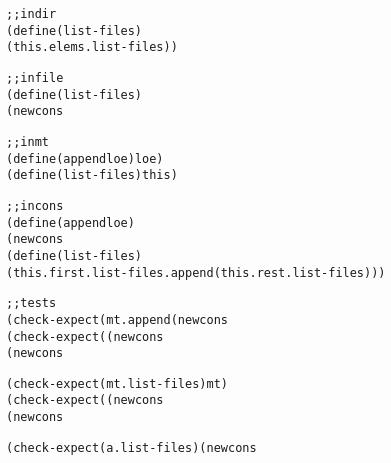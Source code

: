 \documentclass[12pt]{article}                   %
\newenvironment{solution}{\color{red}}{}
\begin{document}
\begin{problem}
\begin{solution}
\begin{alltt}
;; in dir%
(define (list-files)
  (this . elems . list-files))

;; in file%
(define (list-files)
  (new cons% this (new mt%)))

;; in mt%
(define (append loe) loe)
(define (list-files) this)

;; in cons%
(define (append loe)
  (new cons% (this . first) (this . rest . append loe)))
(define (list-files)
  (this . first . list-files . append (this . rest . list-files)))


;; tests
(check-expect (mt . append (new cons% a mt)) (new cons% a mt))
(check-expect ((new cons% a mt) . append (new cons% b mt))
              (new cons% a (new cons% b mt)))

(check-expect (mt . list-files) mt)
(check-expect ((new cons% a (new cons% b mt)) . list-files)
              (new cons% a (new cons% b mt)))

(check-expect (a . list-files) (new cons% a mt))
\end{alltt}
\end{solution}

\end{problem}
\newpage
\end{document}
